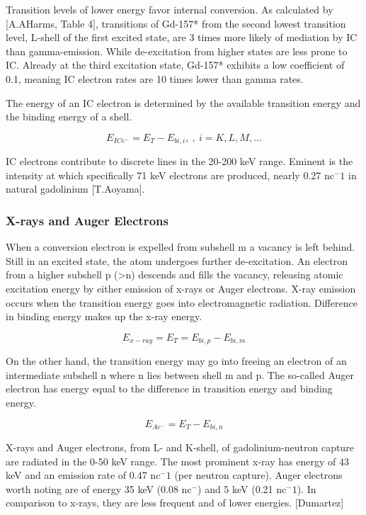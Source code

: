 Transition levels of lower energy favor internal conversion. As calculated by [A.AHarms, Table 4], transitions of Gd-157* from the second lowest transition level, L-shell of the first excited state, are 3 times more likely of mediation by IC than gamma-emission. While de-excitation from higher states are less prone to IC. Already at the third excitation state, Gd-157* exhibits a low coefficient of 0.1, meaning IC electron rates are 10 times lower than gamma rates.

The energy of an IC electron is determined by the available transition energy and the binding energy of a shell.

  \begin{equation}
      E_{ICe^- }=E_T-E_{bi,i},\ , \ i = K, L, M, ...
  \end{equation}

IC electrons contribute to discrete lines in the 20-200 keV range. Eminent is the intensity at which specifically 71 keV electrons are produced, nearly 0.27 nc$^-1$ in natural gadolinium [T.Aoyama].

\subsubsection{X-rays and Auger Electrons}
When a conversion electron is expelled from subshell m a vacancy is left behind. Still in an excited state, the atom undergoes further de-excitation. An electron from a higher subshell p (>n) descends and fills the vacancy, releasing atomic excitation energy by either emission of x-rays or Auger electrons.
X-ray emission occurs when the transition energy goes into electromagnetic radiation. Difference in binding energy makes up the x-ray energy.

  \begin{equation}
      E_{x-ray} = E_T = E_{bi,p}-E_{bi,m}
  \end{equation}

On the other hand, the transition energy may go into freeing an electron of an intermediate subshell n where n lies between shell m and p. The so-called Auger electron has energy equal to the difference in transition energy and binding energy.

\begin{equation}
    E_{Ae^-} = E_T-E_{bi,n}
\end{equation}

 X-rays and Auger electrons, from L- and K-shell, of gadolinium-neutron capture are radiated in the 0-50 keV range. The most prominent x-ray has energy of 43 keV and an emission rate of 0.47 nc$^-1$ (per neutron capture). Auger electrons worth noting are of energy 35 keV (0.08 nc$^-$) and 5 keV (0.21 nc$^-1$). In comparison to x-rays, they are less frequent and of lower energies. [Dumartez]

